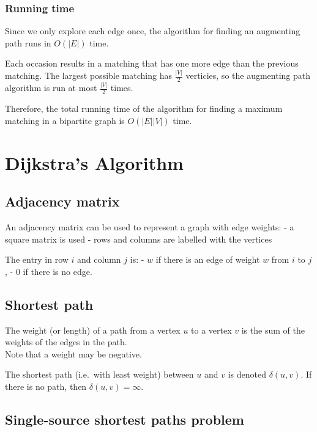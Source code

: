 \documentclass[11pt]{article}
\begin{document}
    \subsubsection{Running time}\label{running-time}

Since we only explore each edge once, the algorithm for finding an
augmenting path runs in \(O(|E|)\) time.

Each occasion results in a matching that has one more edge than the
previous matching. The largest possible matching has \(\frac{|V|}{2}\)
verticies, so the augmenting path algorithm is run at most
\(\frac{|V|}{2}\) times.

Therefore, the total running time of the algorithm for finding a maximum
matching in a bipartite graph is \(O(|E||V|)\) time.

    \section{Dijkstra's Algorithm}\label{dijkstras-algorithm}

\subsection{Adjacency matrix}\label{adjacency-matrix}

An adjacency matrix can be used to represent a graph with edge weights:
- a square matrix is used - rows and columns are labelled with the
vertices

The entry in row \(i\) and column \(j\) is: - \(w\) if there is an edge
of weight \(w\) from \(i\) to \(j\), - \(0\) if there is no edge.

    \subsection{Shortest path}\label{shortest-path}

The weight (or length) of a path from a vertex \(u\) to a vertex \(v\)
is the sum of the weights of the edges in the path.\\
Note that a weight may be negative.

The shortest path (i.e.~with least weight) between \(u\) and \(v\) is
denoted \(\delta (u, v)\). If there is no path, then
\(\delta (u, v) = \infty\).

    \subsection{Single-source shortest paths
problem}\label{single-source-shortest-paths-problem}
\end{document}
